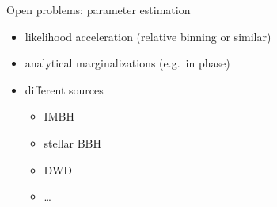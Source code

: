 \documentclass[
  ignorenonframetext,
]{beamer}
\providecommand{\tightlist}{%
  \setlength{\itemsep}{0pt}\setlength{\parskip}{0pt}}\usepackage{longtable,booktabs,array}
\begin{document}
\begin{frame}{Open problems: parameter estimation}
\label{open-problems-parameter-estimation}
\begin{itemize}
\tightlist
\item
  likelihood acceleration (relative binning or similar)
\item
  analytical marginalizations (e.g.~in phase)
\item
  different sources

  \begin{itemize}
  \tightlist
  \item
    IMBH
  \item
    stellar BBH
  \item
    DWD
  \item
    \ldots{}
  \end{itemize}
\end{itemize}
\end{frame}
\end{document}
